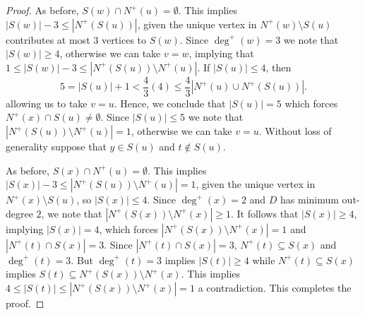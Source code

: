 \documentclass[10pt,a4paper]{amsart}
\begin{document}
\begin{proof}
    As before, $S(w) \cap N^+(u) = \emptyset$.
    This implies $|S(w)| - 3 \leq |N^+(S(u))|$, given the unique vertex in $N^+(w)\setminus S(u)$
    contributes at most $3$ vertices to $S(w)$.
    Since $\deg^+(w) = 3$ we note that $|S(w)|\geq 4$,
    otherwise we can take $v = w$,
    implying that $1 \leq |S(w)| - 3 \leq |N^+(S(u))\setminus N^+(u)|$.
    If $|S(u)|\leq 4$, then 
    \[
    5 = |S(u)| + 1 < \frac{4}{3}(4) \leq \frac{4}{3}|N^+(u) \cup N^+(S(u))|.
    \]
    allowing us to take $v = u$.
    Hence, we conclude that $|S(u)| = 5$ which forces $N^+(x)\cap S(u) \neq \emptyset$.
    Since $|S(u)|\leq 5$ we note that $|N^+(S(u))\setminus N^+(u)| = 1$, otherwise we can take $v = u$.
    Without loss of generality suppose that $y \in S(u)$ and $t\notin S(u)$.

    As before, $S(x) \cap N^+(u) = \emptyset$.
    This implies $|S(x)| - 3 \leq |N^+(S(u))\setminus N^+(u)| = 1$, given the unique vertex in $N^+(x)\setminus S(u)$, so $|S(x)|\leq 4$.
    Since $\deg^+(x) = 2$ and $D$ has minimum out-degree $2$, we note that $|N^+(S(x))\setminus N^+(x)|\geq 1$.
    It follows that $|S(x)| \geq 4$, implying $|S(x)|= 4$, which forces
    $|N^+(S(x))\setminus N^+(x)|= 1$ and $|N^+(t) \cap S(x)| = 3$.
    Since $|N^+(t) \cap S(x)| = 3$, $N^+(t) \subseteq S(x)$ and $\deg^+(t) = 3$.
    But $\deg^+(t) = 3$ implies $|S(t)|\geq 4$ while $N^+(t) \subseteq S(x)$ implies
    $S(t) \subseteq N^+(S(x))\setminus N^+(x)$.
    This implies $4 \leq |S(t)| \leq |N^+(S(x))\setminus N^+(x)| =1$ a contradiction.
    This completes the proof.
\end{proof}
\end{document}
